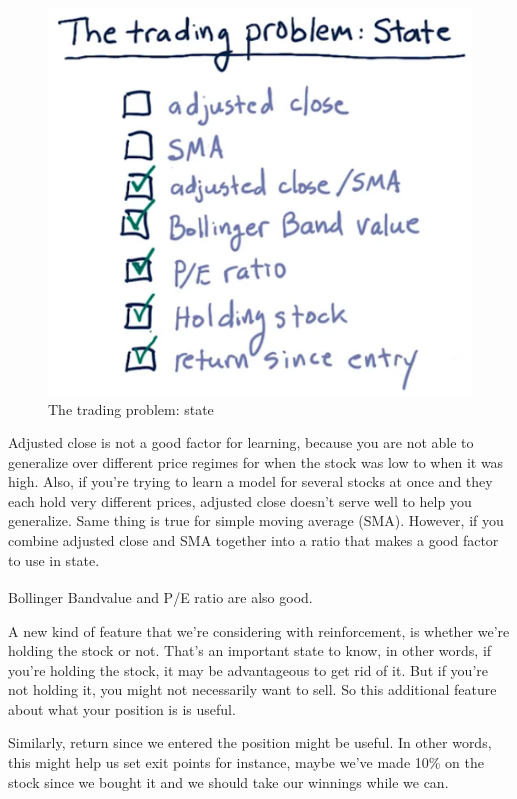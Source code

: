\documentclass[12pt]{article}
\begin{document}
\begin{figure}[!ht]
\centering
\includegraphics[scale=0.45]{fig/fig110}
\caption{The trading problem: state}
\end{figure}

Adjusted close is not a good factor for learning, because you are not able to generalize over different price regimes for when the stock was low to when it was high. Also, if you're trying to learn a model for several stocks at once and they each hold very different prices, adjusted close doesn't serve well to help you generalize. Same thing is true for simple moving average (SMA). However, if you combine adjusted close and SMA together into a ratio that makes a good factor to use in state. 

Bollinger Band\textsuperscript\textregistered value and P/E ratio are also good. 

A new kind of feature that we're considering with reinforcement, is whether we're holding the stock or not. That's an important state to know, in other words, if you're holding the stock, it may be advantageous to get rid of it. But if you're not holding it, you might not necessarily want to sell. So this additional feature about what your position is is useful.

Similarly, return since we entered the position might be useful. In other words, this might help us set exit points for instance, maybe we've made 10\% on the stock since we bought it and we should take our winnings while we can. 
\end{document}
